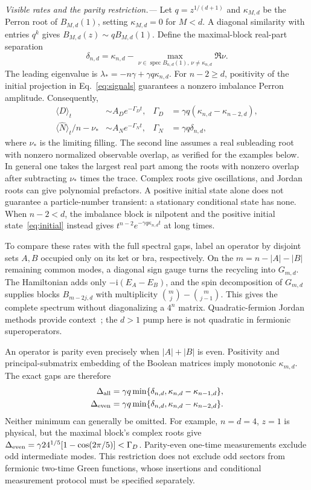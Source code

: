 \documentclass[aps,pra,reprint,superscriptaddress,nofootinbib]{revtex4-2}
\newcommand{\spec}{\operatorname{spec}}
\newcommand{\ii}{\mathrm{i}}
\begin{document}
\emph{Visible rates and the parity restriction.---}
Let $q=z^{1/(d+1)}$ and $\kappa_{M,d}$ be the Perron root of $B_{M,d}(1)$, setting $\kappa_{M,d}=0$ for $M<d$. A diagonal similarity with entries $q^k$ gives $B_{M,d}(z)\sim qB_{M,d}(1)$. Define the maximal-block real-part separation
\begin{equation}
\delta_{n,d}=\kappa_{n,d}-\max_{\nu\in\spec B_{n,d}(1),\,\nu\ne\kappa_{n,d}}\Re\nu.
\label{eq:delta}
\end{equation}
The leading eigenvalue is $\lambda_*=-n\gamma+\gamma q\kappa_{n,d}$. For $n-2\ge d$, positivity of the initial projection in Eq.~\eqref{eq:signals} guarantees a nonzero imbalance Perron amplitude. Consequently,
\begin{align}
\langle D\rangle_t&\sim A_D e^{-\Gamma_D t},&
\Gamma_D&=\gamma q(\kappa_{n,d}-\kappa_{n-2,d}),\nonumber\\
\langle\hat N\rangle_t/n-\nu_*&\sim A_N e^{-\Gamma_Nt},&
\Gamma_N&=\gamma q\delta_{n,d},
\label{eq:rates}
\end{align}
where $\nu_*$ is the limiting filling. The second line assumes a real subleading root with nonzero normalized observable overlap, as verified for the examples below. In general one takes the largest real part among the roots with nonzero overlap after subtracting $\nu_*$ times the trace. Complex roots give oscillations, and Jordan roots can give polynomial prefactors. A positive initial state alone does not guarantee a particle-number transient: a stationary conditional state has none. When $n-2<d$, the imbalance block is nilpotent and the positive initial state~\eqref{eq:initial} instead gives $t^{n-2}e^{-\gamma q\kappa_{n,d}t}$ at long times.

To compare these rates with the full spectral gaps, label an operator by disjoint sets $A,B$ occupied only on its ket or bra, respectively. On the $m=n-|A|-|B|$ remaining common modes, a diagonal sign gauge turns the recycling into $G_{m,d}$. The Hamiltonian adds only $-\ii(E_A-E_B)$, and the spin decomposition of $G_{m,d}$ supplies blocks $B_{m-2j,d}$ with multiplicity $\binom mj-\binom m{j-1}$. This gives the complete spectrum without diagonalizing a $4^n$ matrix. Quadratic-fermion Jordan methods provide context~\cite{Prosen}; the $d>1$ pump here is not quadratic in fermionic superoperators.

An operator is parity even precisely when $|A|+|B|$ is even. Positivity and principal-submatrix embedding of the Boolean matrices imply monotonic $\kappa_{m,d}$. The exact gaps are therefore
\begin{align}
\Delta_{\rm all}&=\gamma q\min\{\delta_{n,d},\kappa_{n,d}-\kappa_{n-1,d}\},\nonumber\\
\Delta_{\rm even}&=\gamma q\min\{\delta_{n,d},\kappa_{n,d}-\kappa_{n-2,d}\}.
\label{eq:gaps}
\end{align}
Neither minimum can generally be omitted. For example, $n=d=4$, $z=1$ is physical, but the maximal block's complex roots give $\Delta_{\rm even}=\gamma24^{1/5}[1-\cos(2\pi/5)]<\Gamma_D$. Parity-even one-time measurements exclude odd intermediate modes. This restriction does not exclude odd sectors from fermionic two-time Green functions, whose insertions and conditional measurement protocol must be specified separately.
\end{document}
